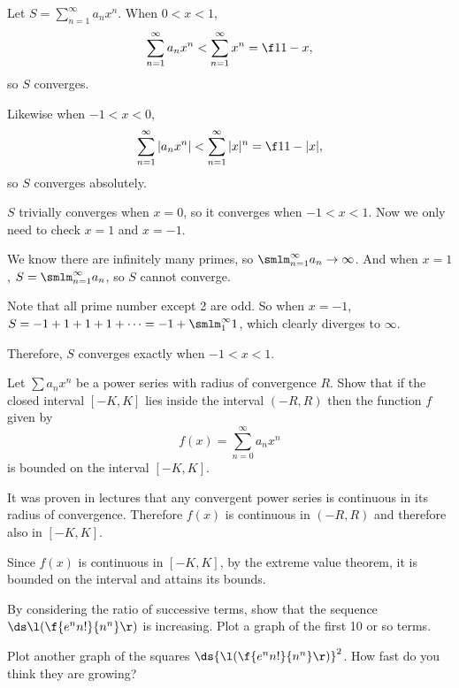 \documentclass[a4paper]{article}
\begin{document}
Let $S = \sum_{n=1}^\infty a_n x^n$. When $0 < x < 1$, \[
\sum_{n=1}^\infty a_n x^n < \sum_{n=1}^\infty x^n = \f1{1-x},
\] so $S$ converges.

Likewise when $-1 < x < 0$, \[
\sum_{n=1}^\infty |a_n x^n| < \sum_{n=1}^\infty |x|^n = \f1{1-|x|},
\] so $S$ converges absolutely.

$S$ trivially converges when $x=0$, so it converges when $-1 < x < 1$. Now we only need to check $x=1$ and $x=-1$.

We know there are infinitely many primes, so $\smlm_{n=1}^\infty a_n \to \infty$. And when $x = 1$, $S = \smlm_{n=1}^\infty a_n$, so $S$ cannot converge.

Note that all prime number except 2 are odd. So when $x = -1$, $S = -1 + 1 + 1 + 1 + \cdots = -1 + \smlm_1^\infty 1$, which clearly diverges to $\infty$.

Therefore, $S$ converges exactly when $-1 < x < 1$.


\begin{questionbody}
Let $\sum a_n x^n$ be a power series with radius of convergence $R$. Show that if the closed interval $[-K, K]$ lies inside the interval $(-R, R)$ then the function $f$ given by \[
f(x) = \sum_{n=0}^\infty a_n x^n
\] is bounded on the interval $[-K, K]$.
\end{questionbody}


It was proven in lectures that any convergent power series is continuous in its radius of convergence. Therefore $f(x)$ is continuous in $(-R, R)$ and therefore also in $[-K, K]$.

Since $f(x)$ is continuous in $[-K, K]$, by the extreme value theorem, it is bounded on the interval and attains its bounds.


\begin{questionbody}
By considering the ratio of successive terms, show that the sequence $\ds\l( \f{e^n n!}{n^n} \r)$ is increasing. Plot a graph of the first 10 or so terms.

Plot another graph of the squares $\ds{\l( \f{e^n n!}{n^n} \r)}^2$. How fast do you think they are growing?
\end{questionbody}
\end{document}
